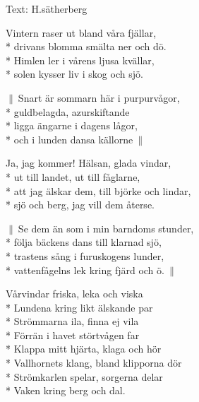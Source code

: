 \begin{SongText}
    \begin{SongInfo}
        Text: H.sätherberg
    \end{SongInfo}
    \begin{SongVerse}
        Vintern raser ut bland våra fjällar,\\*%
        drivans blomma smälta ner och dö.\\*%
        Himlen ler i vårens ljusa kvällar,\\*%
        solen kysser liv i skog och sjö.
    \end{SongVerse}
    \begin{SongVerse}
        $\|\:$Snart är sommarn här i purpurvågor,\\*%
        guldbelagda, azurskiftande\\*%
        ligga ängarne i dagens lågor,\\*%
        och i lunden dansa källorne$\:\|$
    \end{SongVerse}
    \begin{SongVerse}
        Ja, jag kommer! Hälsan, glada vindar,\\*%
        ut till landet, ut till fåglarne,\\*%
        att jag älskar dem, till björke och lindar,\\*%
        sjö och berg, jag vill dem återse.
    \end{SongVerse}
    \begin{SongVerse}
        $\|\:$Se dem än som i min barndoms stunder,\\*%
        följa bäckens dans till klarnad sjö,\\*%
        trastens sång i furuskogens lunder,\\*%
        vattenfågelns lek kring fjärd och ö.$\:\|$
    \end{SongVerse}
\end{SongText}
\begin{SongText}
    \begin{SongVerse}
        Vårvindar friska, leka och viska\\*%
        Lundena kring likt älskande par\\*%
        Strömmarna ila, finna ej vila\\*%
        Förrän i havet störtvågen far\\*%
        Klappa mitt hjärta, klaga och hör\\*%
        Vallhornets klang, bland klipporna dör\\*%
        Strömkarlen spelar, sorgerna delar\\*%
        Vaken kring berg och dal.
    \end{SongVerse}
\end{SongText}
